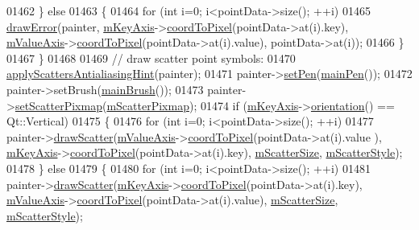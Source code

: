 \begin{DoxyCode}
01462     \} \textcolor{keywordflow}{else}
01463     \{
01464       \textcolor{keywordflow}{for} (\textcolor{keywordtype}{int} i=0; i<pointData->size(); ++i)
01465         \hyperlink{a00031_a4df6807066ce877705e999773e7ffbc4}{drawError}(painter, \hyperlink{a00024_a692421b963472fa6e16156a74ba96832}{mKeyAxis}->\hyperlink{a00025_a985ae693b842fb0422b4390fe36d299a}{coordToPixel}(pointData->at(i).key), 
      \hyperlink{a00024_acfc46d619ab9598be33b64146da45822}{mValueAxis}->\hyperlink{a00025_a985ae693b842fb0422b4390fe36d299a}{coordToPixel}(pointData->at(i).value), pointData->at(i));
01466     \}
01467   \}
01468   
01469   \textcolor{comment}{// draw scatter point symbols:}
01470   \hyperlink{a00024_a753272ee225a62827e90c3e1e78de4b1}{applyScattersAntialiasingHint}(painter);
01471   painter->\hyperlink{a00047_af9c7a4cd1791403901f8c5b82a150195}{setPen}(\hyperlink{a00024_a19276ed2382a3a06464417b8788b1451}{mainPen}());
01472   painter->setBrush(\hyperlink{a00024_ae74c123832da180c17e22203e748d9b7}{mainBrush}());
01473   painter->\hyperlink{a00047_a0f636de68b40d2e169ab15a8ca067107}{setScatterPixmap}(\hyperlink{a00031_a38fccb64b03a53f3ba2839c94dc31e8f}{mScatterPixmap});
01474   \textcolor{keywordflow}{if} (\hyperlink{a00024_a692421b963472fa6e16156a74ba96832}{mKeyAxis}->\hyperlink{a00025_a57483f2f60145ddc9e63f3af53959265}{orientation}() == Qt::Vertical)
01475   \{
01476     \textcolor{keywordflow}{for} (\textcolor{keywordtype}{int} i=0; i<pointData->size(); ++i)
01477       painter->\hyperlink{a00047_a3aa145eb9865752d583c40ef995c5049}{drawScatter}(\hyperlink{a00024_acfc46d619ab9598be33b64146da45822}{mValueAxis}->\hyperlink{a00025_a985ae693b842fb0422b4390fe36d299a}{coordToPixel}(pointData->at(i).value
      ), \hyperlink{a00024_a692421b963472fa6e16156a74ba96832}{mKeyAxis}->\hyperlink{a00025_a985ae693b842fb0422b4390fe36d299a}{coordToPixel}(pointData->at(i).key), \hyperlink{a00031_a0a1d01359f53211427fb4d71a71dbbec}{mScatterSize}, 
      \hyperlink{a00031_a8f255af6fe1df09cedec73857ca0b344}{mScatterStyle});
01478   \} \textcolor{keywordflow}{else}
01479   \{
01480     \textcolor{keywordflow}{for} (\textcolor{keywordtype}{int} i=0; i<pointData->size(); ++i)
01481       painter->\hyperlink{a00047_a3aa145eb9865752d583c40ef995c5049}{drawScatter}(\hyperlink{a00024_a692421b963472fa6e16156a74ba96832}{mKeyAxis}->\hyperlink{a00025_a985ae693b842fb0422b4390fe36d299a}{coordToPixel}(pointData->at(i).key), 
      \hyperlink{a00024_acfc46d619ab9598be33b64146da45822}{mValueAxis}->\hyperlink{a00025_a985ae693b842fb0422b4390fe36d299a}{coordToPixel}(pointData->at(i).value), 
      \hyperlink{a00031_a0a1d01359f53211427fb4d71a71dbbec}{mScatterSize}, \hyperlink{a00031_a8f255af6fe1df09cedec73857ca0b344}{mScatterStyle});

\end{DoxyCode}
